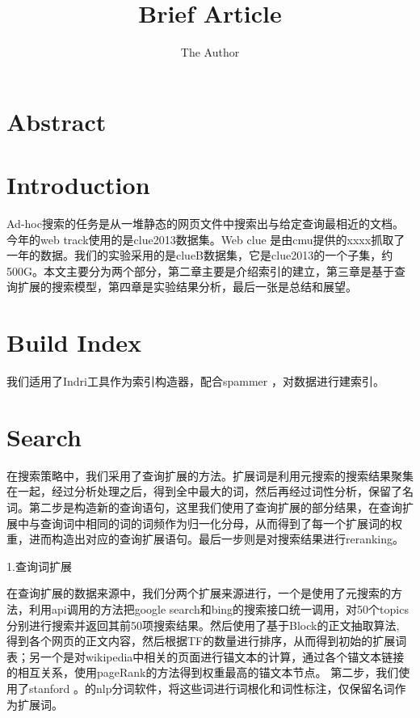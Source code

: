 \documentclass[11pt]{article} %
\title{Brief Article}
\author{The Author}
\begin{document}
\begin{CJK}{UTF8}{gkai}
\maketitle

\section{Abstract}


\section{Introduction}

Ad-hoc搜索的任务是从一堆静态的网页文件中搜索出与给定查询最相近的文档。今年的web track使用的是clue2013数据集。Web clue 是由cmu提供的xxxx抓取了一年的数据。我们的实验采用的是clueB数据集，它是clue2013的一个子集，约500G。本文主要分为两个部分，第二章主要是介绍索引的建立，第三章是基于查询扩展的搜索模型，第四章是实验结果分析，最后一张是总结和展望。

\section{Build Index}
我们适用了Indri工具作为索引构造器，配合spammer \cite{Kxxspammer}，对数据进行建索引。

\section{Search}
在搜索策略中，我们采用了查询扩展的方法。扩展词是利用元搜索的搜索结果聚集在一起，经过分析处理之后，得到全中最大的词，然后再经过词性分析，保留了名词。第二步是构造新的查询语句，这里我们使用了查询扩展的部分结果，在查询扩展中与查询词中相同的词的词频作为归一化分母，从而得到了每一个扩展词的权重，进而构造出对应的查询扩展语句。最后一步则是对搜索结果进行reranking。

1.查询词扩展

在查询扩展的数据来源中，我们分两个扩展来源进行，一个是使用了元搜索的方法，利用api调用的方法把google search和bing的搜索接口统一调用，对50个topics分别进行搜索并返回其前50项搜索结果。然后使用了基于Block的正文抽取算法\cite{2012-Lin-p256-264}, 得到各个网页的正文内容，然后根据TF的数量进行排序，从而得到初始的扩展词表；另一个是对wikipedia中相关的页面进行锚文本的计算，通过各个锚文本链接的相互关系，使用pageRank的方法得到权重最高的锚文本节点。
第二步，我们使用了stanford
。的nlp分词软件，将这些词进行词根化和词性标注，仅保留名词作为扩展词。


\end{CJK}
\end{document}
